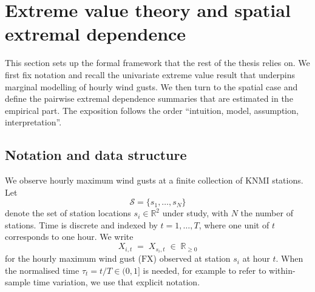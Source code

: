 \section{Extreme value theory and spatial extremal dependence}
\label{sec:evt-spatial}

This section sets up the formal framework that the rest of the thesis
relies on. We first fix notation and recall the univariate extreme
value result that underpins marginal modelling of hourly wind gusts.
We then turn to the spatial case and define the pairwise extremal
dependence summaries that are estimated in the empirical part. The
exposition follows the order ``intuition, model, assumption,
interpretation''.

\subsection{Notation and data structure}\label{sec:evt-notation}

We observe hourly maximum wind gusts at a finite collection of KNMI
stations. Let
\[
    \mathcal{S} = \{s_1,\dots,s_N\}
\]
denote the set of station locations \(s_i \in \mathbb{R}^2\) under
study, with \(N\) the number of stations.
Time is discrete and indexed by \(t = 1,\dots,T\), where one unit of
\(t\) corresponds to one hour. We write
\[
    X_{i,t} \;=\; X_{s_i,t} \;\in\; \mathbb{R}_{\ge 0}
\]
for the hourly maximum wind gust (\(\mathrm{FX}\)) observed at
station \(s_i\) at hour \(t\). When the normalised time
\(\tau_t = t/T \in (0,1]\) is needed, for example to refer to within-
sample time variation, we use that explicit notation.

